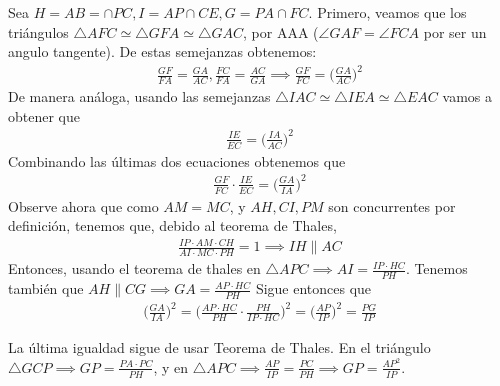 \begin{sol}
	Sea $H = AB = \cap PC, I = AP \cap CE, G = PA \cap FC$. Primero, veamos que los tri\'angulos $\triangle AFC \simeq \triangle GFA \simeq \triangle GAC$, por AAA ($\angle{GAF} = \angle{FCA}$ por ser un angulo tangente). De estas semejanzas obtenemos:
	\begin{align}
	\frac{GF}{FA} = \frac{GA}{AC}, \frac{FC}{FA} = \frac{AC}{GA} \implies \frac{GF}{FC} = \bigg(\frac{GA}{AC}\bigg)^{2}
	\end{align}
	De manera an\'aloga, usando las semejanzas $\triangle IAC \simeq \triangle IEA \simeq \triangle EAC$ vamos a obtener que 
	\begin{align}
	\frac{IE}{EC} = \bigg(\frac{IA}{AC}\bigg)^{2}
	\end{align}
	Combinando las \'ultimas dos ecuaciones obtenemos que
	\begin{align}
	\frac{GF}{FC} \cdot \frac{IE}{EC} = \bigg(\frac{GA}{IA}\bigg)^{2} \label{EQ6}
	\end{align}
	Observe ahora que como $AM = MC$, y $AH, CI, PM$ son concurrentes por definici\'on, tenemos que, debido al teorema de Thales,
	\begin{align}
	\frac{IP \cdot AM \cdot CH}{AI \cdot MC \cdot PH} = 1 \implies IH \parallel AC 
	\end{align}
	Entonces, usando el teorema de thales en $\triangle APC \implies AI = \frac{IP \cdot HC}{PH}$. Tenemos tambi\'en que $AH \parallel CG \implies GA = \frac{AP \cdot HC}{PH}$
	Sigue entonces que
	\begin{align}
	\bigg(\frac{GA}{IA}\bigg)^{2} = \bigg(\frac{AP \cdot HC}{PH} \cdot \frac{PH}{IP \cdot HC}\bigg)^{2} = \bigg(\frac{AP}{IP}\bigg)^{2} = \frac{PG}{IP} \label{EQ7}
	\end{align}
	
	La \'ultima igualdad sigue de usar Teorema de Thales. En el tri\'angulo $\triangle GCP \implies GP = \frac{PA \cdot PC}{PH}$, y en $\triangle APC \implies \frac{AP}{IP} = \frac{PC}{PH} \implies GP = \frac{AP^{2}}{IP}$.
	

\end{sol}
